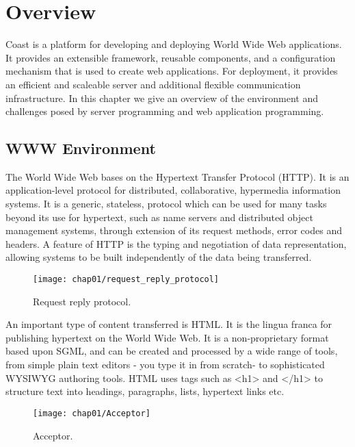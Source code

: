 \clearpage{}
\chapter{Overview}\label{Overview}
Coast is a platform for developing and deploying World Wide Web
applications. It provides an extensible framework, reusable
components, and a configuration mechanism that is used to create web
applications. For deployment, it provides an efficient and scaleable
server and additional flexible communication infrastructure.
In this chapter we give an overview of the environment and challenges
posed by server programming and web application programming.

\section{WWW Environment}
The World Wide Web bases on the Hypertext Transfer Protocol (HTTP). It
is an application-level protocol for distributed, collaborative,
hypermedia information systems. It is a generic, stateless, protocol
which can be used for many tasks beyond its use for hypertext, such as
name servers and distributed object management systems, through
extension of its request methods, error codes and headers. A feature
of HTTP is the typing and negotiation of data representation, allowing
systems to be built independently of the data being transferred. 

\begin{figure}[hbt]
  \centering
  \texttt{[image: chap01/request\_reply\_protocol]}
  \caption{Request reply protocol.}
  \label{fig:request_reply_protocol}
\end{figure}

An important type of content transferred is HTML. It is the lingua
franca for publishing hypertext on the World Wide Web. It is a
non-proprietary format based upon SGML, and can be created and
processed by a wide range of tools, from simple plain text editors -
you type it in from scratch- to sophisticated WYSIWYG authoring tools.
HTML uses tags such as <h1> and </h1> to structure text into headings,
paragraphs, lists, hypertext links etc. 

\begin{figure}[hbt]
  \centering
  \texttt{[image: chap01/Acceptor]}
  \caption{Acceptor.}
  \label{fig:zipstream}
\end{figure}
